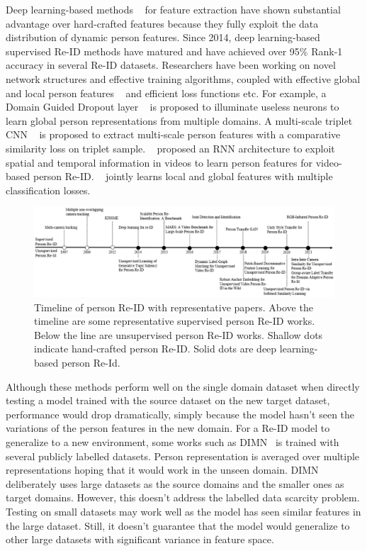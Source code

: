 \documentclass[a4paper,fleqn]{cas-dc}
\begin{document}
Deep learning-based methods ~\cite{li_harmonious_2018,si_dual_2018,zhao_deeply-learned_2017,zhou_point_2017,li_person_2017} for feature extraction have shown substantial advantage over hard-crafted features because they fully exploit the data distribution of dynamic person features. Since 2014, deep learning-based supervised Re-ID methods have matured and have achieved over 95\% Rank-1 accuracy in several Re-ID datasets. Researchers have been working on novel network structures and effective training algorithms, coupled with effective global and local person features ~\cite{li_learning_2017,zhao_spindle_2017} and efficient loss functions etc. For example, a Domain Guided Dropout layer ~\cite{xiao_learning_2016} is proposed to illuminate useless neurons to learn global person representations from multiple domains. A multi-scale triplet CNN ~\cite{liu_multi-scale_2016} is proposed to extract multi-scale person features with a comparative similarity loss on triplet sample. ~\cite{mclaughlin_recurrent_2016} proposed an RNN architecture to exploit spatial and temporal information in videos to learn person features for video-based person Re-ID. ~\cite{li_person_2017} jointly learns local and global features with multiple classification losses.

\begin{figure}[t]
\begin{center}
\includegraphics[width=\textwidth]{timeline.PNG}
\end{center}
\caption{Timeline of person Re-ID with representative papers. Above the timeline are some representative supervised person Re-ID works. Below the line are unsupervised person Re-ID works. Shallow dots indicate hand-crafted person Re-ID. Solid dots are deep learning-based person Re-Id.}
\label{fig:timeline}
\end{figure}

Although these methods perform well on the single domain dataset when directly testing a model trained with the source dataset on the new target dataset, performance would drop dramatically, simply because the model hasn't seen the variations of the person features in the new domain. For a Re-ID model to generalize to a new environment, some works such as DIMN~\cite{song_generalizable_2019} is trained with several publicly labelled datasets. Person representation is averaged over multiple representations hoping that it would work in the unseen domain. DIMN deliberately uses large datasets as the source domains and the smaller ones as target domains. However, this doesn't address the labelled data scarcity problem. Testing on small datasets may work well as the model has seen similar features in the large dataset. Still, it doesn't guarantee that the model would generalize to other large datasets with significant variance in feature space. 
\end{document}
